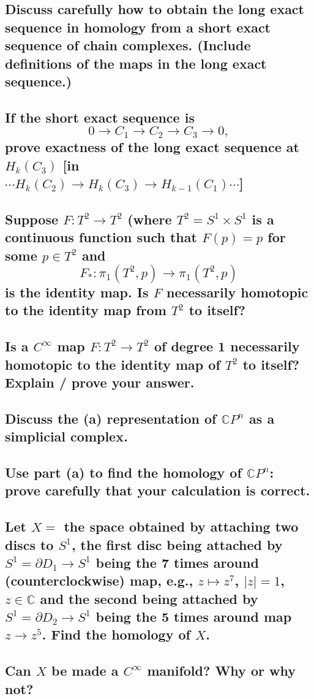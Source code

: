 \documentclass[10pt]{article}
\newcommand{\del}{\ensuremath{\partial}} \newcommand{\rank}{\ensuremath{\mathrm{rank}}}
\newcommand{\advsection}{\addtocounter{section}{1} \setcounter{subsection}{0}}
\begin{document}
\advsection{}

\subsection{Discuss carefully how to obtain the long exact sequence in homology from a short exact
  sequence of chain complexes. (Include definitions of the maps in the long exact sequence.)}

\subsection{If the short exact sequence is 
$$0 \to C_1 \to C_2 \to C_3 \to 0,$$
prove exactness of the long exact sequence at $H_k(C_3)$ [in $\cdots H_k (C_2) \to H_k(C_3) \to
H_{k-1}(C_1) \cdots$]}

\advsection{}

\subsection{Suppose $F: T^2 \to T^2$ (where $T^2 = S^1 \times S^1$ is a continuous function such
  that $F(p ) =p$ for some $p \in T^2$ and
$$F_* : \pi_1(T^2, p) \to \pi_1(T^2, p) $$
is the identity map. Is $F$ necessarily homotopic to the identity map from $T^2$ to itself?  }

\subsection{Is a $C^\infty$ map $F: T^2 \to T^2$ of degree 1 necessarily homotopic to the identity
  map of $T^2$ to itself? Explain / prove your answer.}

\advsection{}

\subsection{Discuss the (a) representation of $\mathbb{C} P^n$ as a simplicial complex.}

\subsection{Use part (a) to find the homology of $\mathbb{C} P^n$: prove carefully that your
  calculation is correct.}

\advsection{}

\subsection{Let $X =$ the space obtained by attaching two discs to $S^1$, the first disc being
  attached by $S^1 = \del D_1 \to S^1$ being the 7 times around (counterclockwise) map, e.g.,
  $z\mapsto z^7$, $|z|=1$, $z \in \mathbb{C} $ and the second being attached by $S^1 = \del D_2 \to
  S^1$ being the 5 times around map $z \to z^5$. Find the homology of $X$.}


\subsection{Can $X$ be made a $C^\infty$ manifold? Why or why not?}
\end{document}
